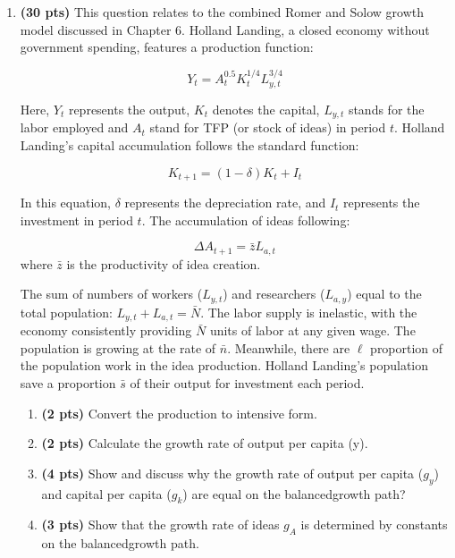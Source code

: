 \documentclass[addpoints,12pt,answers]{exam}
\begin{document}
\begin{enumerate}[label=\textbf{\arabic*.}, itemsep=15pt]
		\clearpage 
		\item  \textbf{(30 pts)}\label{P6}  This question relates to the combined Romer and Solow  growth model discussed in Chapter 6. Holland Landing, a closed economy without government spending, features a production function:
		
		\[Y_t = A_t^{0.5} K_t^{1/4} L_{y,t}^{3/4}\]
		
		Here, \(Y_t\) represents the output, \(K_t\) denotes the capital, \(L_{y,t}\) stands for the labor employed and $A_t$ stand for TFP (or stock of ideas) in period \(t\). Holland Landing's capital accumulation follows the standard function:
		
		\[K_{t+1} = (1 - \delta) K_t + I_t\]
		
		In this equation, \(\delta\) represents the depreciation rate, and \(I_t\) represents the investment in period \(t\). The accumulation of ideas  following:
		
		\[\Delta A_{t+1} = \bar{z}L_{a,t}\]
		where $\bar{z}$ is the productivity of idea creation.
		
		The sum of numbers of workers ($L_{y,t}$) and researchers ($L_{a,y}$) equal to the total population: $L_{y,t} + L_{a,t} = \bar{N}$.  The labor supply is inelastic, with the economy consistently providing \(\bar{N}\) units of labor at any given wage.  The population is growing at the rate of $\bar{n}$. Meanwhile, there are $\ell$ proportion of the population work in the idea production. Holland Landing's population save a proportion \(\bar{s}\) of their output for investment each period.
		
		\begin{enumerate}[label=(\alph*)]
			\item \textbf{(2 pts)} Convert the production to intensive form.
			
			\item \textbf{(2 pts)} Calculate the growth rate of output per capita (y). 

			\item \textbf{(4 pts)} Show and discuss why the growth rate of output per capita ($g_y$) and capital per capita ($g_k$) are equal on the balancedgrowth path? 
			\vspace{1cm}
			
			
			\item \textbf{(3 pts)} Show that the growth rate of ideas $g_A$ is determined by constants on the balancedgrowth path.
			\vspace{1cm}
			

\end{enumerate}
\end{enumerate}
\end{document}
